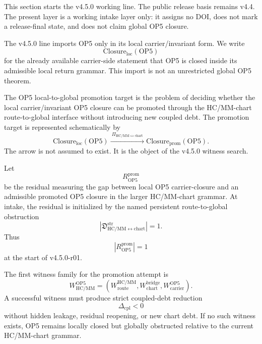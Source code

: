 This section starts the v4.5.0 working line.  The public release basis remains
v4.4.  The present layer is a working intake layer only: it assigns no DOI,
does not mark a release-final state, and does not claim global OP5 closure.

\begin{definition}
The v4.5.0 line imports OP5 only in its local carrier/invariant form.  We write
\[
    \mathrm{Closure}_{\mathrm{loc}}(\mathrm{OP5})
\]
for the already available carrier-side statement that OP5 is closed inside its
admissible local return grammar.  This import is not an unrestricted global
OP5 theorem.
\end{definition}

\begin{definition}
The OP5 local-to-global promotion target is the problem of deciding whether the
local carrier/invariant OP5 closure can be promoted through the HC/MM-chart
route-to-global interface without introducing new coupled debt.  The promotion
target is represented schematically by
\[
    \mathrm{Closure}_{\mathrm{loc}}(\mathrm{OP5})
    \xrightarrow{\ \Pi_{\mathrm{HC/MM\leftrightarrow chart}}\ }
    \mathrm{Closure}_{\mathrm{prom}}(\mathrm{OP5}).
\]
The arrow is not assumed to exist.  It is the object of the v4.5.0 witness
search.
\end{definition}

\begin{definition}
Let
\[
    R_{\mathrm{OP5}}^{\mathrm{prom}}
\]
be the residual measuring the gap between local OP5 carrier-closure and an
admissible promoted OP5 closure in the larger HC/MM-chart grammar.  At intake,
the residual is initialized by the named persistent route-to-global obstruction
\[
    \left|\mathfrak D_{\mathrm{HC/MM}\leftrightarrow\mathrm{chart}}^{\mathrm{str}}\right|=1.
\]
Thus
\[
    |R_{\mathrm{OP5}}^{\mathrm{prom}}|=1
\]
at the start of v4.5.0-r01.
\end{definition}

\begin{definition}
The first witness family for the promotion attempt is
\[
    W_{\mathrm{HC/MM}}^{\mathrm{OP5}}
    =
    \left(
    W_{\mathrm{route}}^{\mathrm{HC/MM}},
    W_{\mathrm{chart}}^{\mathrm{bridge}},
    W_{\mathrm{carrier}}^{\mathrm{OP5}}
    \right).
\]
A successful witness must produce strict coupled-debt reduction
\[
    \Delta_{\mathrm{cpl}}<0
\]
without hidden leakage, residual reopening, or new chart debt.  If no such
witness exists, OP5 remains locally closed but globally obstructed relative to
the current HC/MM-chart grammar.
\end{definition}

